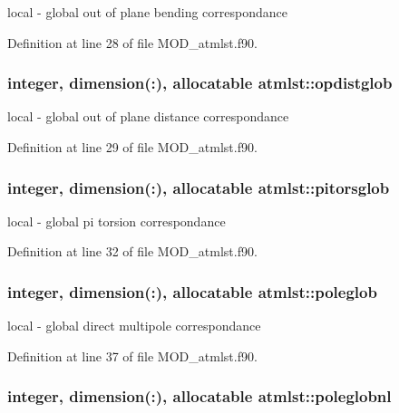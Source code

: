 local -\/ global out of plane bending correspondance 



Definition at line 28 of file M\-O\-D\-\_\-atmlst.\-f90.

\hypertarget{classatmlst_afebb2d4622ffb13863ddb9ab6cbfc88a}{
\subsubsection[{opdistglob}]{\setlength{\rightskip}{0pt plus 5cm}integer, dimension(\-:), allocatable atmlst\-::opdistglob}}\label{classatmlst_afebb2d4622ffb13863ddb9ab6cbfc88a}


local -\/ global out of plane distance correspondance 



Definition at line 29 of file M\-O\-D\-\_\-atmlst.\-f90.

\hypertarget{classatmlst_acc3c988cbf469a7032d0f8ab6659a5fa}{
\subsubsection[{pitorsglob}]{\setlength{\rightskip}{0pt plus 5cm}integer, dimension(\-:), allocatable atmlst\-::pitorsglob}}\label{classatmlst_acc3c988cbf469a7032d0f8ab6659a5fa}


local -\/ global pi torsion correspondance 



Definition at line 32 of file M\-O\-D\-\_\-atmlst.\-f90.

\hypertarget{classatmlst_a03688f66de3d996cffdac3d71f2d184b}{
\subsubsection[{poleglob}]{\setlength{\rightskip}{0pt plus 5cm}integer, dimension(\-:), allocatable atmlst\-::poleglob}}\label{classatmlst_a03688f66de3d996cffdac3d71f2d184b}


local -\/ global direct multipole correspondance 



Definition at line 37 of file M\-O\-D\-\_\-atmlst.\-f90.

\hypertarget{classatmlst_a1d0ed805ac493ce6f1157f6c2c2dc4ea}{
\subsubsection[{poleglobnl}]{\setlength{\rightskip}{0pt plus 5cm}integer, dimension(\-:), allocatable atmlst\-::poleglobnl}}\label{classatmlst_a1d0ed805ac493ce6f1157f6c2c2dc4ea}


